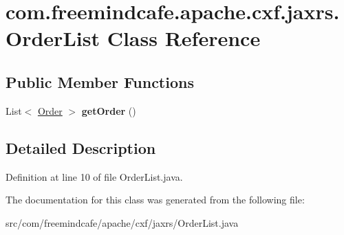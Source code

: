 \hypertarget{classcom_1_1freemindcafe_1_1apache_1_1cxf_1_1jaxrs_1_1_order_list}{}\section{com.\+freemindcafe.\+apache.\+cxf.\+jaxrs.\+Order\+List Class Reference}
\label{classcom_1_1freemindcafe_1_1apache_1_1cxf_1_1jaxrs_1_1_order_list}
\subsection*{Public Member Functions}
\begin{DoxyCompactItemize}
\item 
\hypertarget{classcom_1_1freemindcafe_1_1apache_1_1cxf_1_1jaxrs_1_1_order_list_a70d623e140f08c5a88287982f7c80e87}{}List$<$ \hyperlink{classcom_1_1freemindcafe_1_1apache_1_1cxf_1_1jaxrs_1_1_order}{Order} $>$ {\bfseries get\+Order} ()\label{classcom_1_1freemindcafe_1_1apache_1_1cxf_1_1jaxrs_1_1_order_list_a70d623e140f08c5a88287982f7c80e87}

\end{DoxyCompactItemize}


\subsection{Detailed Description}


Definition at line 10 of file Order\+List.\+java.



The documentation for this class was generated from the following file\+:\begin{DoxyCompactItemize}
\item 
src/com/freemindcafe/apache/cxf/jaxrs/Order\+List.\+java\end{DoxyCompactItemize}
